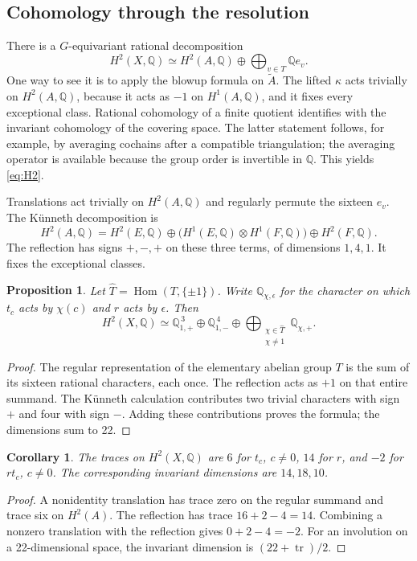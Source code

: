 \documentclass[11pt]{amsart}
\newtheorem{proposition}[theorem]{Proposition}
\newtheorem{corollary}[theorem]{Corollary}
\theoremstyle{definition}
\newcommand{\Q}{\mathbb Q}\newcommand{\C}{\mathbb C}\newcommand{\Z}{\mathbb Z}
\newcommand{\tr}{\operatorname{tr}}\newcommand{\id}{\mathrm{id}}
\begin{document}
\subsection{Cohomology through the resolution}
There is a $G$-equivariant rational decomposition
\begin{equation}\label{eq:H2}
 H^2(X,\Q)\simeq H^2(A,\Q)\oplus\bigoplus_{v\in T}\Q e_v.
\end{equation}
One way to see it is to apply the blowup formula on $\widetilde A$.
The lifted $\kappa$ acts trivially on $H^2(A,\Q)$, because it acts as
$-1$ on $H^1(A,\Q)$, and it fixes every exceptional class. Rational
cohomology of a finite quotient identifies with the invariant
cohomology of the covering space. The latter statement follows, for
example, by averaging cochains after a compatible triangulation; the
averaging operator is available because the group order is invertible
in $\Q$. This yields \eqref{eq:H2}.

Translations act trivially on $H^2(A,\Q)$ and regularly permute the
sixteen $e_v$. The K\"unneth decomposition is
\[
 H^2(A,\Q)=H^2(E,\Q)\oplus
   \bigl(H^1(E,\Q)\otimes H^1(F,\Q)\bigr)\oplus H^2(F,\Q).
\]
The reflection has signs $+,-,+$ on these three terms, of dimensions
$1,4,1$. It fixes the exceptional classes.

\begin{proposition}\label{prop:character}
Let $\widehat T=\operatorname{Hom}(T,\{\pm1\})$. Write
$\Q_{\chi,\epsilon}$ for the character on which $t_c$ acts by
$\chi(c)$ and $r$ acts by $\epsilon$. Then
\[
 H^2(X,\Q)\simeq
 \Q_{1,+}^{\,3}\oplus\Q_{1,-}^{\,4}
       \oplus\bigoplus_{\substack{\chi\in\widehat T\\\chi\ne1}}
                  \Q_{\chi,+}.
\]
\end{proposition}
\begin{proof}
The regular representation of the elementary abelian group $T$ is the
sum of its sixteen rational characters, each once. The reflection acts
as $+1$ on that entire summand. The K\"unneth calculation contributes
two trivial characters with sign $+$ and four with sign $-$. Adding
these contributions proves the formula; the dimensions sum to 22.
\end{proof}

\begin{corollary}\label{cor:traces}
The traces on $H^2(X,\Q)$ are $6$ for $t_c$, $c\ne0$, $14$ for $r$,
and $-2$ for $rt_c$, $c\ne0$. The corresponding invariant dimensions
are $14,18,10$.
\end{corollary}
\begin{proof}
A nonidentity translation has trace zero on the regular summand and
trace six on $H^2(A)$. The reflection has trace $16+2-4=14$.
Combining a nonzero translation with the reflection gives $0+2-4=-2$.
For an involution on a 22-dimensional space, the invariant dimension is
$(22+\tr)/2$.
\end{proof}
\end{document}
